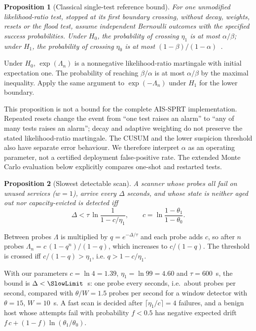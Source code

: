 \documentclass[conference]{IEEEtran}
\newtheorem{proposition}{Proposition}
\begin{document}
\begin{proposition}[Classical single-test reference bound]\label{prop:bounds}
For one unmodified likelihood-ratio test, stopped at its first boundary crossing, without decay, weights, resets or
the flood test, assume independent Bernoulli outcomes with the specified success probabilities. Under $H_0$, the probability
of crossing $\eta_1$ is at most $\alpha/\beta$; under $H_1$, the probability of crossing $\eta_0$ is at most
$(1-\beta)/(1-\alpha)$~\cite{wald1945sequential}.
\end{proposition}
\begin{IEEEproof}
Under $H_0$, $\exp(\Lambda_n)$ is a nonnegative likelihood-ratio martingale with initial expectation one. The
probability of reaching $\beta/\alpha$ is at most $\alpha/\beta$ by the maximal inequality. Apply the same argument
to $\exp(-\Lambda_n)$ under $H_1$ for the lower boundary.
\end{IEEEproof}
This proposition is not a bound for the complete AIS-SPRT implementation. Repeated resets change the event from
``one test raises an alarm'' to ``any of many tests raises an alarm''; decay and adaptive weighting do not preserve
the stated likelihood-ratio martingale. The CUSUM and the lower suspicion threshold also have separate error
behaviour. We therefore interpret $\alpha$ as an operating parameter, not a certified deployment false-positive rate.
The extended Monte Carlo evaluation below explicitly compares one-shot and restarted tests.

\begin{proposition}[Slowest detectable scan]\label{prop:rate}
A scanner whose probes all fail on unused services ($w=1$), arrive every $\Delta$ seconds, and whose state is
neither aged out nor capacity-evicted is detected iff
\begin{equation}
\Delta < \tau\,\ln\!\frac{1}{1-c/\eta_1},\qquad c=\ln\frac{1-\theta_1}{1-\theta_0}.
\end{equation}
\end{proposition}
\begin{IEEEproof}
Between probes $\Lambda$ is multiplied by $q=e^{-\Delta/\tau}$ and each probe adds $c$, so after $n$ probes
$\Lambda_n=c\,(1-q^n)/(1-q)$, which increases to $c/(1-q)$. The threshold is crossed iff $c/(1-q)>\eta_1$, i.e.
$q>1-c/\eta_1$.
\end{IEEEproof}
With our parameters $c=\ln4=1.39$, $\eta_1=\ln99=4.60$ and $\tau=600$~s, the bound is $\Delta<\SlowLimit$~s: one probe
every \SlowLimit{} seconds, i.e.\ about \SlowRate{} probes per second, compared with $\theta/W=1.5$ probes per second for a
window detector with $\theta=15$, $W=10$~s. A fast scan is decided after $\lceil\eta_1/c\rceil=4$ failures, and a benign
host whose attempts fail with probability $f<0.5$ has negative expected drift $f\,c+(1-f)\ln(\theta_1/\theta_0)$.
\end{document}
